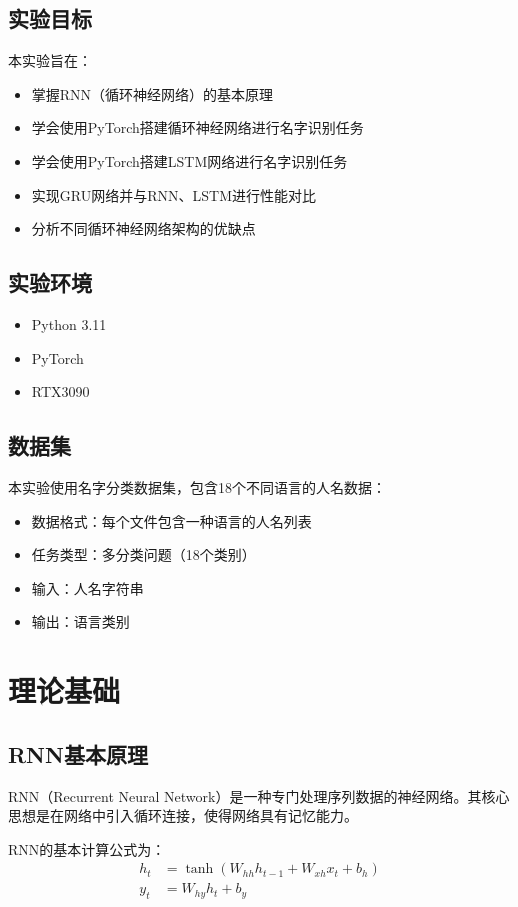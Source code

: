 \documentclass[a4paper]{article}
\begin{document}
\subsection{实验目标}
本实验旨在：
\begin{itemize}
    \item 掌握RNN（循环神经网络）的基本原理
    \item 学会使用PyTorch搭建循环神经网络进行名字识别任务
    \item 学会使用PyTorch搭建LSTM网络进行名字识别任务
    \item 实现GRU网络并与RNN、LSTM进行性能对比
    \item 分析不同循环神经网络架构的优缺点
\end{itemize}

\subsection{实验环境}
\begin{itemize}
    \item Python 3.11
    \item PyTorch 
    \item RTX3090
\end{itemize}

\subsection{数据集}
本实验使用名字分类数据集，包含18个不同语言的人名数据：
\begin{itemize}
    \item 数据格式：每个文件包含一种语言的人名列表
    \item 任务类型：多分类问题（18个类别）
    \item 输入：人名字符串
    \item 输出：语言类别
\end{itemize}

\section{理论基础}
\subsection{RNN基本原理}
RNN（Recurrent Neural Network）是一种专门处理序列数据的神经网络。其核心思想是在网络中引入循环连接，使得网络具有记忆能力。

RNN的基本计算公式为：
\begin{align}
    h_t &= \tanh(W_{hh}h_{t-1} + W_{xh}x_t + b_h) \\
    y_t &= W_{hy}h_t + b_y
\end{align}
\end{document}
